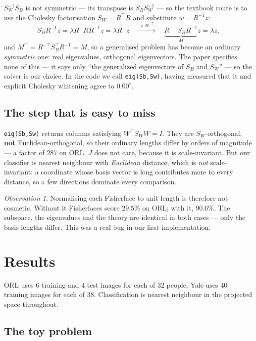 \documentclass[11pt]{article}
\theoremstyle{remark}
\newtheorem*{observation}{Observation}
\newcommand{\Sw}{S_W}
\newcommand{\Sb}{S_B}
\begin{document}
$\Sw^{-1}\Sb$ is not symmetric --- its transpose is $\Sb\Sw^{-1}$ --- so the
textbook route is to use the Cholesky factorisation $\Sw=R^{\!\top}R$ and
substitute $w=R^{-1}z$:
\[
  \Sb R^{-1}z=\lambda R^{\!\top}RR^{-1}z=\lambda R^{\!\top}z
  \quad\xrightarrow{\ \times R^{-\top}\ }\quad
  \underbrace{R^{-\top}\Sb R^{-1}}_{M}z=\lambda z ,
\]
and $M^{\!\top}=R^{-\top}\Sb^{\!\top}R^{-1}=M$, so a generalised problem has
become an ordinary \emph{symmetric} one: real eigenvalues, orthogonal
eigenvectors. The paper specifies none of this --- it says only ``the
generalized eigenvectors of $\Sb$ and $\Sw$'' --- so the solver is our choice.
In the code we call \texttt{eig(Sb,Sw)}, having measured that it and explicit
Cholesky whitening agree to $0.00^\circ$.

\subsection{The step that is easy to miss}
\label{sec:unitnorm}

\texttt{eig(Sb,Sw)} returns columns satisfying $W^{\!\top}\Sw W = I$. They are
$\Sw$-orthogonal, \textbf{not} Euclidean-orthogonal, so their ordinary lengths
differ by orders of magnitude --- a factor of $287$ on ORL. $J$ does not care,
because it is scale-invariant. But our classifier is nearest neighbour with
\emph{Euclidean} distance, which is \emph{not} scale-invariant: a coordinate
whose basis vector is long contributes more to every distance, so a few
directions dominate every comparison.

\begin{observation}
Normalising each Fisherface to unit length is therefore not cosmetic. Without
it Fisherfaces score $\mathbf{29.5\%}$ on ORL; with it, $\mathbf{90.6\%}$. The
subspace, the eigenvalues and the theory are identical in both cases --- only
the basis lengths differ. This was a real bug in our first implementation.
\end{observation}

\section{Results}

ORL uses 6 training and 4 test images for each of 32 people; Yale uses 40
training images for each of 38. Classification is nearest neighbour in the
projected space throughout.

\subsection{The toy problem}
\end{document}
